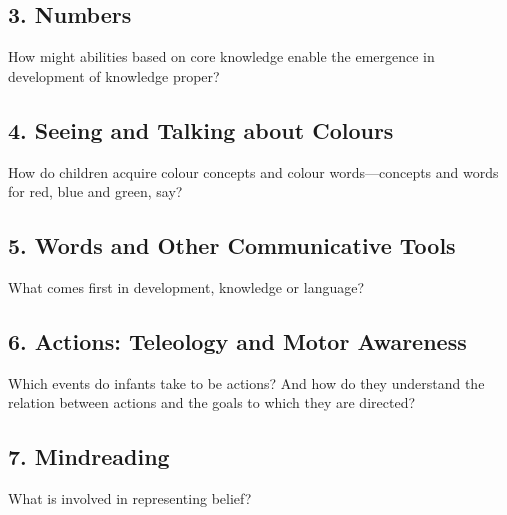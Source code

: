 \documentclass[12pt]{extarticle}
\begin{document}
\begin{multicols}{3}
\subsection{3. Numbers}

How might abilities based on core knowledge enable the emergence in development of knowledge proper?\citep{
xu:2000_large,
wynn:1992_addition,
Fodor:1981ep,
carey:2009_origin}



\subsection{4. Seeing and Talking about Colours}
How do children acquire colour concepts and colour words---concepts and words for red, blue and green, say?\citep{Soja:1994np,
franklin:2010_hemispheric,
Franklin:2005hp}



\subsection{5. Words and Other Communicative Tools}
What comes first in development, knowledge or language?\citep{Wittgenstein:1974dk,
Bloom:2000qz,
Senghas:2001zm,
Goldin-Meadow:2003pj} 




\subsection{6. Actions: Teleology and Motor Awareness}
Which events do infants take to be actions?
And how do they understand the relation between actions and the goals to which they are directed?\citep{Bratman:1987xw,Csibra:1998cx,
rizzolatti_functional_2010,
bekkering:2000_imitation}

\subsection{7. Mindreading}
What is involved in representing belief?\citep[]{Onishi:2005hm, Southgate:2007js,kovacs_social_2010,
Davidson:1990du}

 \setlength{\bibsep}{3pt}
\footnotesize 


\end{multicols}
\end{document}
